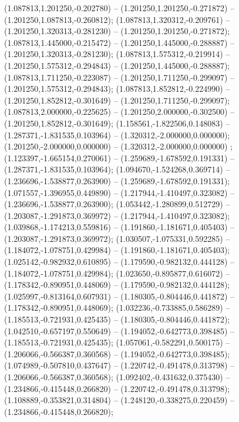  (1.087813,1.201250,-0.202780) -- (1.201250,1.201250,-0.271872) -- (1.201250,1.087813,-0.260812);
 (1.087813,1.320312,-0.209761) -- (1.201250,1.320313,-0.281230) -- (1.201250,1.201250,-0.271872);
 (1.087813,1.445000,-0.215472) -- (1.201250,1.445000,-0.288887) -- (1.201250,1.320313,-0.281230);
 (1.087813,1.575312,-0.219914) -- (1.201250,1.575312,-0.294843) -- (1.201250,1.445000,-0.288887);
 (1.087813,1.711250,-0.223087) -- (1.201250,1.711250,-0.299097) -- (1.201250,1.575312,-0.294843);
 (1.087813,1.852812,-0.224990) -- (1.201250,1.852812,-0.301649) -- (1.201250,1.711250,-0.299097);
 (1.087813,2.000000,-0.225625) -- (1.201250,2.000000,-0.302500) -- (1.201250,1.852812,-0.301649);
 (1.158561,-1.822506,0.148083) -- (1.287371,-1.831535,0.103964) -- (1.320312,-2.000000,0.000000);
 (1.201250,-2.000000,0.000000) -- (1.320312,-2.000000,0.000000) ;
 (1.123397,-1.665154,0.270061) -- (1.259689,-1.678592,0.191331) -- (1.287371,-1.831535,0.103964);
 (1.094670,-1.524268,0.369714) -- (1.236696,-1.538877,0.263900) -- (1.259689,-1.678592,0.191331);
 (1.071557,-1.396955,0.449890) -- (1.217944,-1.410497,0.323082) -- (1.236696,-1.538877,0.263900);
 (1.053442,-1.280899,0.512729) -- (1.203087,-1.291873,0.369972) -- (1.217944,-1.410497,0.323082);
 (1.039868,-1.174213,0.559816) -- (1.191860,-1.181671,0.405403) -- (1.203087,-1.291873,0.369972);
 (1.030507,-1.075331,0.592285) -- (1.184072,-1.078751,0.429984) -- (1.191860,-1.181671,0.405403);
 (1.025142,-0.982932,0.610895) -- (1.179590,-0.982132,0.444128) -- (1.184072,-1.078751,0.429984);
 (1.023650,-0.895877,0.616072) -- (1.178342,-0.890951,0.448069) -- (1.179590,-0.982132,0.444128);
 (1.025997,-0.813164,0.607931) -- (1.180305,-0.804446,0.441872) -- (1.178342,-0.890951,0.448069);
 (1.032236,-0.733885,0.586289) -- (1.185513,-0.721931,0.425435) -- (1.180305,-0.804446,0.441872);
 (1.042510,-0.657197,0.550649) -- (1.194052,-0.642773,0.398485) -- (1.185513,-0.721931,0.425435);
 (1.057061,-0.582291,0.500175) -- (1.206066,-0.566387,0.360568) -- (1.194052,-0.642773,0.398485);
 (1.074989,-0.507810,0.437647) -- (1.220742,-0.491478,0.313798) -- (1.206066,-0.566387,0.360568);
 (1.092402,-0.431632,0.375430) -- (1.234866,-0.415448,0.266820) -- (1.220742,-0.491478,0.313798);
 (1.108889,-0.353821,0.314804) -- (1.248120,-0.338275,0.220459) -- (1.234866,-0.415448,0.266820);
